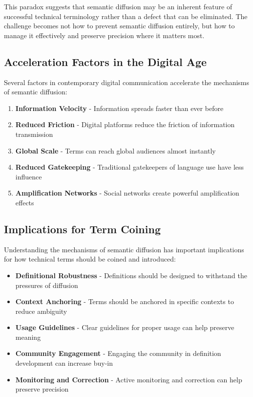 \documentclass[11pt]{article}
\begin{document}
This paradox suggests that semantic diffusion may be an inherent feature of successful technical terminology rather than a defect that can be eliminated. The challenge becomes not how to prevent semantic diffusion entirely, but how to manage it effectively and preserve precision where it matters most.

\subsection{Acceleration Factors in the Digital Age}

Several factors in contemporary digital communication accelerate the mechanisms of semantic diffusion:

\begin{enumerate}
\item \textbf{Information Velocity} - Information spreads faster than ever before
\item \textbf{Reduced Friction} - Digital platforms reduce the friction of information transmission
\item \textbf{Global Scale} - Terms can reach global audiences almost instantly
\item \textbf{Reduced Gatekeeping} - Traditional gatekeepers of language use have less influence
\item \textbf{Amplification Networks} - Social networks create powerful amplification effects
\end{enumerate}

\subsection{Implications for Term Coining}

Understanding the mechanisms of semantic diffusion has important implications for how technical terms should be coined and introduced:

\begin{itemize}
\item \textbf{Definitional Robustness} - Definitions should be designed to withstand the pressures of diffusion
\item \textbf{Context Anchoring} - Terms should be anchored in specific contexts to reduce ambiguity
\item \textbf{Usage Guidelines} - Clear guidelines for proper usage can help preserve meaning
\item \textbf{Community Engagement} - Engaging the community in definition development can increase buy-in
\item \textbf{Monitoring and Correction} - Active monitoring and correction can help preserve precision
\end{itemize}
\end{document}
